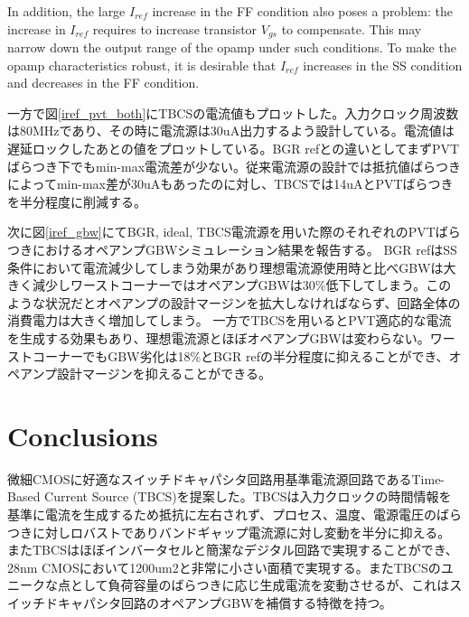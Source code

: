 \documentclass[letterpaper, 10 pt, conference]{ieeeconf}  %
\begin{document}
In addition, the large $I_{ref}$ increase in the FF condition also poses a problem: the increase in $I_{ref}$ requires to increase transistor $V_{gs}$ to compensate. This may narrow down the output range of the opamp under such conditions. To make the opamp characteristics robust, it is desirable that $I_{ref}$ increases in the SS condition and decreases in the FF condition.

一方で図\ref{iref_pvt_both}にTBCSの電流値もプロットした。入力クロック周波数は80MHzであり、その時に電流源は30uA出力するよう設計している。電流値は遅延ロックしたあとの値をプロットしている。BGR refとの違いとしてまずPVTばらつき下でもmin-max電流差が少ない。従来電流源の設計では抵抗値ばらつきによってmin-max差が30uAもあったのに対し、TBCSでは14uAとPVTばらつきを半分程度に削減する。

次に図\ref{iref_gbw}にてBGR, ideal, TBCS電流源を用いた際のそれぞれのPVTばらつきにおけるオペアンプGBWシミュレーション結果を報告する。
BGR refはSS条件において電流減少してしまう効果があり理想電流源使用時と比べGBWは大きく減少しワーストコーナーではオペアンプGBWは30\%低下してしまう。このような状況だとオペアンプの設計マージンを拡大しなければならず、回路全体の消費電力は大きく増加してしまう。
一方でTBCSを用いるとPVT適応的な電流を生成する効果もあり、理想電流源とほぼオペアンプGBWは変わらない。ワーストコーナーでもGBW劣化は18\%とBGR refの半分程度に抑えることができ、オペアンプ設計マージンを抑えることができる。

\section{Conclusions}
微細CMOSに好適なスイッチドキャパシタ回路用基準電流源回路であるTime-Based Current Source (TBCS)を提案した。TBCSは入力クロックの時間情報を基準に電流を生成するため抵抗に左右されず、プロセス、温度、電源電圧のばらつきに対しロバストでありバンドギャップ電流源に対し変動を半分に抑える。またTBCSはほぼインバータセルと簡潔なデジタル回路で実現することができ、28nm CMOSにおいて1200um2と非常に小さい面積で実現する。またTBCSのユニークな点として負荷容量のばらつきに応じ生成電流を変動させるが、これはスイッチドキャパシタ回路のオペアンプGBWを補償する特徴を持つ。



\end{document}
